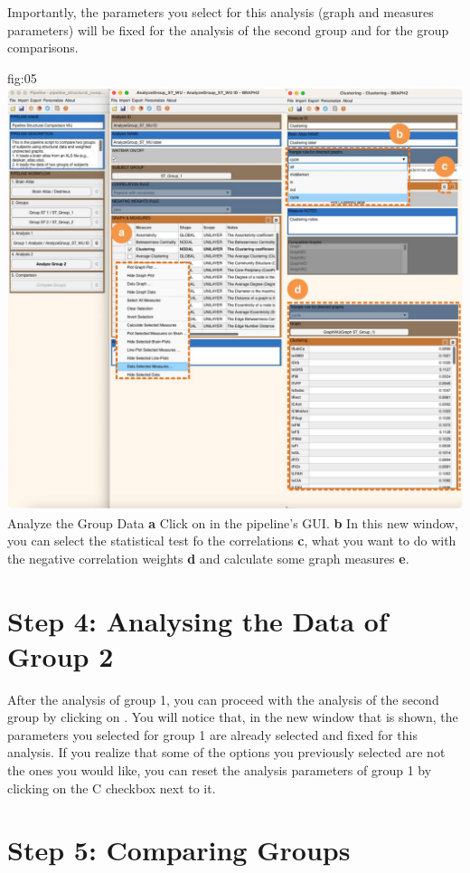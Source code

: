 \documentclass[justified]{tufte-handout}
\begin{document}
Importantly, the parameters you select for this analysis (graph and measures parameters) will be fixed for the analysis of the second group and for the group comparisons.

	{fig:05}
	{
	\includegraphics{fig05.jpg}
	}
	{Analyze the Group Data}
	{
	{\bf a} Click on  in the pipeline's GUI.
	{\bf b} In this new window, you can select the statistical test fo the correlations {\bf c}, what you want to do with the negative correlation weights {\bf d} and calculate some graph measures {\bf e}.
	}
 
\section{Step 4: Analysing the Data of Group 2}

After the analysis of group 1, you can proceed with the analysis of the second group by clicking on . You will notice that, in the new window that is shown, the parameters you selected for group 1 are already selected and fixed for this analysis. If you realize that some of the options you previously selected are not the ones you would like, you can reset the analysis parameters of group 1 by clicking on the C checkbox next to it.

\section{Step 5: Comparing Groups}
\end{document}
